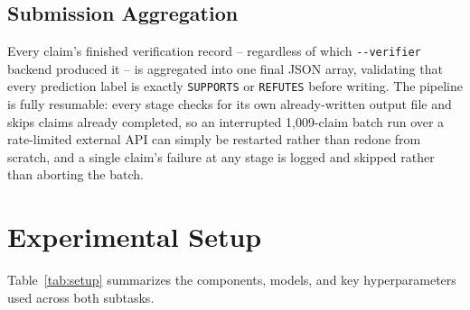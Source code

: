 \documentclass[
]{ceurart}
\begin{document}
\subsection{Submission Aggregation}

Every claim's finished verification record -- regardless of which
\texttt{-{}-verifier} backend produced it -- is aggregated into one
final JSON array, validating that every prediction label is exactly
\texttt{SUPPORTS} or \texttt{REFUTES} before writing. The pipeline is
fully resumable: every stage checks for its own already-written output
file and skips claims already completed, so an interrupted
1{,}009-claim batch run over a rate-limited external API can simply be
restarted rather than redone from scratch, and a single claim's failure
at any stage is logged and skipped rather than aborting the batch.

\section{Experimental Setup}

Table~\ref{tab:setup} summarizes the components, models, and key
hyperparameters used across both subtasks.
\end{document}
